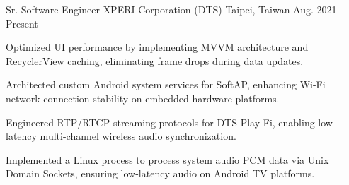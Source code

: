 
\begin{cventries}

  \cventry
    {Sr. Software Engineer} %
    {XPERI Corporation (DTS)} %
    {Taipei, Taiwan} %
    {Aug. 2021 - Present} %
    {
      \begin{cvitems} %
	\item {Optimized UI performance by implementing MVVM architecture and RecyclerView caching, eliminating frame drops during data updates.}
        \item {Architected custom Android system services for SoftAP, enhancing Wi-Fi network connection stability on embedded hardware platforms.}
        \item {Engineered RTP/RTCP streaming protocols for DTS Play-Fi, enabling low-latency multi-channel wireless audio synchronization.}
        \item {Implemented a Linux process to process system audio PCM data via Unix Domain Sockets, ensuring low-latency audio on Android TV platforms.}
      \end{cvitems}
    }


\end{cventries}
